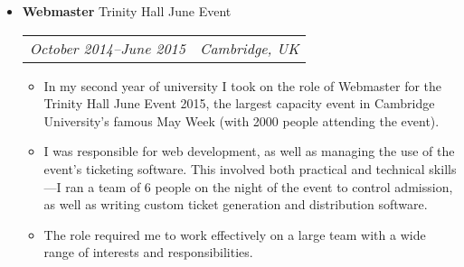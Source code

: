 \documentclass[letterpaper]{article}
\def\footerlink{}
\begin{document}
\begin{itemize}


    \item \textbf{Webmaster} Trinity Hall June Event \\
        \begin{tabular}{c|c}
            \emph{October 2014--June 2015} & \emph{Cambridge, UK}
        \end{tabular}
        \begin{itemize}
            \item In my second year of university I took on the role of
              Webmaster for the Trinity Hall June Event 2015, the largest
              capacity event in Cambridge University's famous May Week (with
              2000 people attending the event).

            \item I was responsible for web development, as well as managing the
              use of the event's ticketing software. This involved both
              practical and technical skills---I ran a team of 6 people on the
              night of the event to control admission, as well as writing custom
              ticket generation and distribution software.
            
            \item The role required me to work effectively on a large team with
              a wide range of interests and responsibilities.
        \end{itemize}

\end{itemize}

\end{document}
